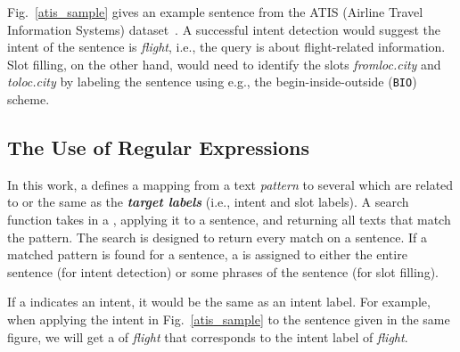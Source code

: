 
 Fig.~\ref{atis_sample} gives an example sentence from the ATIS (Airline Travel Information Systems)
dataset~\cite{hemphill1990atis}. A successful intent detection would suggest the intent of the sentence is \emph{flight}, i.e., the query
is about flight-related information. Slot filling, on the other hand, would need to identify the slots \emph{fromloc.city} and
\emph{toloc.city} by labeling the sentence using e.g., the begin-inside-outside (\texttt{BIO}) scheme.




\subsection{The Use of Regular Expressions}
\label{re_desc}

In this work, a \RE defines a mapping from a text \emph{pattern} to several \textbf{\emph{\REtags}} which are related to or the same as the
\textbf{\emph{target labels}} (i.e., intent and slot labels). A search function takes in a \RE, applying it to a sentence, and returning
all texts that match the pattern. The search is designed to return every match on a sentence. If a matched pattern is found for a sentence,
a \REtag is assigned to either the entire sentence (for intent detection) or some phrases of the sentence (for slot filling).


If a \REtag indicates an intent, it would be the same as an intent label. For example, when applying the intent \RE in
Fig.~\ref{atis_sample} to the sentence given in the same figure, we will get a \REtag of \emph{flight} that corresponds to the intent
label of \emph{flight}.



